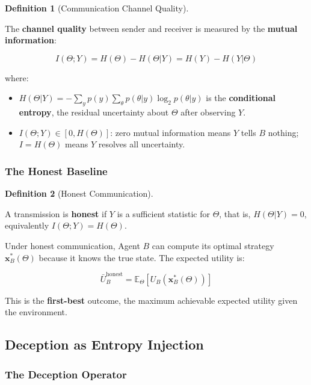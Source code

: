 \documentclass[11pt]{article}
\theoremstyle{plain}
\theoremstyle{definition}
\newtheorem{definition}{Definition}
\theoremstyle{remark}
\let\origsubsection\subsection
\renewcommand{\subsection}{\needspace{7\baselineskip}\origsubsection}
\let\origsubsubsection\subsubsection
\renewcommand{\subsubsection}{\needspace{4\baselineskip}\origsubsubsection}
\begin{document}
\begin{definition}[Communication Channel Quality]
\label{def-channel-quality}

The \textbf{channel quality} between sender and receiver is measured by the \textbf{mutual information}:

$$I(\Theta; Y) = H(\Theta) - H(\Theta | Y) = H(Y) - H(Y | \Theta)$$

where:
\begin{itemize}
\item $H(\Theta | Y) = -\sum_{y} p(y) \sum_{\theta} p(\theta | y) \log_2 p(\theta | y)$ is the \textbf{conditional entropy}, the residual uncertainty about $\Theta$ after observing $Y$.
\item $I(\Theta; Y) \in [0, H(\Theta)]$: zero mutual information means $Y$ tells $B$ nothing; $I = H(\Theta)$ means $Y$ resolves all uncertainty.
\end{itemize}

\end{definition}

\subsubsection{The Honest Baseline}\label{the-honest-baseline}

\begin{definition}[Honest Communication]
\label{def-honest-communication}

A transmission is \textbf{honest} if $Y$ is a sufficient statistic for $\Theta$, that is, $H(\Theta | Y) = 0$, equivalently $I(\Theta; Y) = H(\Theta)$.
\end{definition}

Under honest communication, Agent \(B\) can compute its optimal strategy
\(\mathbf{x}_B^*(\Theta)\) because it knows the true state. The expected
utility is:

\[\bar{U}_B^{\text{honest}} = \mathbb{E}_\Theta\left[ U_B\left(\mathbf{x}_B^*(\Theta)\right) \right]\]

This is the \textbf{first-best} outcome, the maximum achievable expected
utility given the environment.

\subsection{Deception as Entropy
Injection}\label{deception-as-entropy-injection-1}

\subsubsection{The Deception Operator}\label{the-deception-operator}
\end{document}

